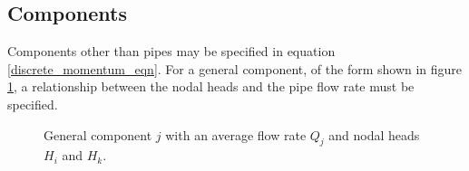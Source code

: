 

\subsection{Components}

Components other than pipes may be specified in equation \eqref{discrete_momentum_eqn}. For a general component, of the form shown in figure \ref{fig:general_component}, a relationship between the nodal heads and the pipe flow rate must be specified. 

\begin{figure}
\centering
{} 
\caption{General component $j$ with an average flow rate $Q_j$ and nodal heads $H_i$ and $H_k$.}
\label{fig:general_component}
\end{figure}


%







